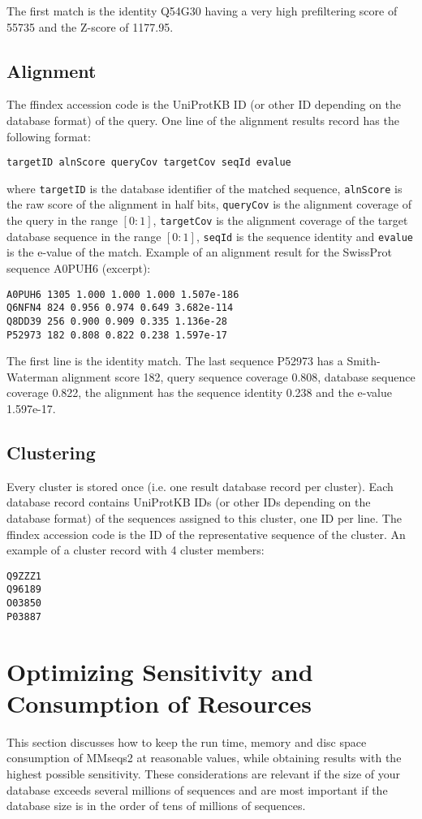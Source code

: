 \documentclass[11pt,a4paper]{scrreprt}
\begin{document}
The first match is the identity Q54G30 having a very high prefiltering score of 55735 and the Z-score of 1177.95. 
\subsection{Alignment}
The ffindex accession code is the UniProtKB ID (or other ID depending on the database format) of the query. One line of the alignment results record has the following format:

\begin{verbatim}
targetID alnScore queryCov targetCov seqId evalue
\end{verbatim}

where \texttt{targetID} is the database identifier of the matched sequence, \texttt{alnScore} is the raw score of the alignment in half bits, \texttt{queryCov} is the alignment coverage of the query in the range $[0:1]$, \texttt{targetCov} is the alignment coverage of the target database sequence in the range $[0:1]$, \texttt{seqId} is the sequence identity and \texttt{evalue} is the e-value of the match. Example of an alignment result for the SwissProt sequence A0PUH6 (excerpt):

\begin{verbatim}
A0PUH6 1305 1.000 1.000 1.000 1.507e-186
Q6NFN4 824 0.956 0.974 0.649 3.682e-114
Q8DD39 256 0.900 0.909 0.335 1.136e-28
P52973 182 0.808 0.822 0.238 1.597e-17
\end{verbatim}

The first line is the identity match. The last sequence P52973 has a Smith-Waterman alignment score 182, query sequence coverage 0.808, database sequence coverage 0.822, the alignment has the sequence identity 0.238 and the e-value 1.597e-17.
\subsection{Clustering}
Every cluster is stored once (i.e. one result database record per cluster). Each database record contains UniProtKB IDs (or other IDs depending on the database format) of the sequences assigned to this cluster, one ID per line. The ffindex accession code is the ID of the representative sequence of the cluster. An example of a cluster record with 4 cluster members:

\begin{verbatim}
Q9ZZZ1
Q96189
O03850
P03887
\end{verbatim}


\section{Optimizing Sensitivity and Consumption of Resources} \label{sec:Sensitivity-and-consumption}
This section discusses how to keep the run time, memory and disc space consumption of MMseqs2 at reasonable values, while obtaining results with the highest possible sensitivity. These considerations are relevant if the size of your database exceeds several millions of sequences and are most important if the database size is in the order of tens of millions of sequences.
\end{document}
